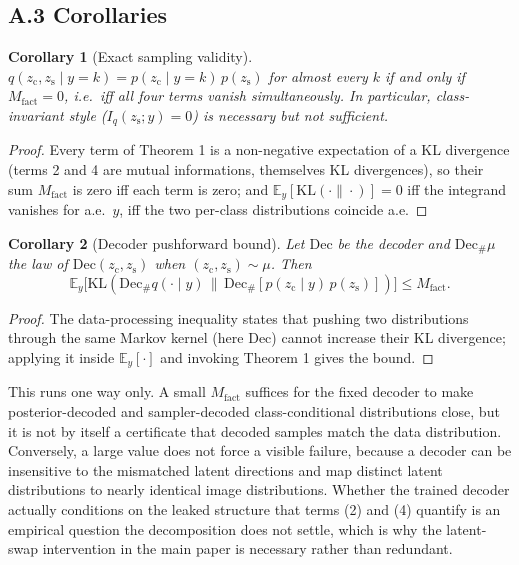 \documentclass[letterpaper]{article} %
\newtheorem{corollary}{Corollary}
\newcommand{\zc}{z_{\mathrm{c}}}
\newcommand{\zs}{z_{\mathrm{s}}}
\newcommand{\KL}{\mathrm{KL}}
\begin{document}
\subsection{A.3 Corollaries}

\begin{corollary}[Exact sampling validity]
$q(\zc,\zs\mid y{=}k)=p(\zc\mid y{=}k)\,p(\zs)$ for almost every $k$ if and
only if $M_{\mathrm{fact}}=0$, i.e.\ iff all four terms vanish
simultaneously. In particular, class-invariant style ($I_q(\zs;y)=0$) is
necessary but not sufficient.
\end{corollary}

\begin{proof}
Every term of Theorem 1 is a non-negative expectation of a KL divergence
(terms 2 and 4 are mutual informations, themselves KL divergences), so their
sum $M_{\mathrm{fact}}$ is zero iff each term is zero; and $\mathbb
E_y[\KL(\cdot\|\cdot)]=0$ iff the integrand vanishes for a.e.\ $y$, iff the
two per-class distributions coincide a.e.
\end{proof}

\begin{corollary}[Decoder pushforward bound]
Let $\mathrm{Dec}$ be the decoder and $\mathrm{Dec}_\#\mu$ the law of
$\mathrm{Dec}(\zc,\zs)$ when $(\zc,\zs)\sim\mu$. Then
\[
\mathbb E_y\bigl[\KL(\mathrm{Dec}_\# q(\cdot\mid y)\,\|\,\mathrm{Dec}_\#[p(\zc\mid y)\,p(\zs)])\bigr] \le M_{\mathrm{fact}}.
\]
\end{corollary}

\begin{proof}
The data-processing inequality states that pushing two distributions through
the same Markov kernel (here $\mathrm{Dec}$) cannot increase their KL
divergence; applying it inside $\mathbb E_y[\cdot]$ and invoking Theorem 1
gives the bound.
\end{proof}

This runs one way only. A small $M_{\mathrm{fact}}$ suffices for the fixed
decoder to make posterior-decoded and sampler-decoded class-conditional
distributions close, but it is not by itself a certificate that decoded
samples match the data distribution. Conversely, a large value does not force
a visible failure, because a decoder can be insensitive to the mismatched
latent directions and map distinct latent distributions to nearly identical
image distributions. Whether the trained decoder actually conditions on the
leaked structure that terms (2) and (4) quantify is an empirical question the
decomposition does not settle, which is why the latent-swap intervention in
the main paper is necessary rather than redundant.
\end{document}
